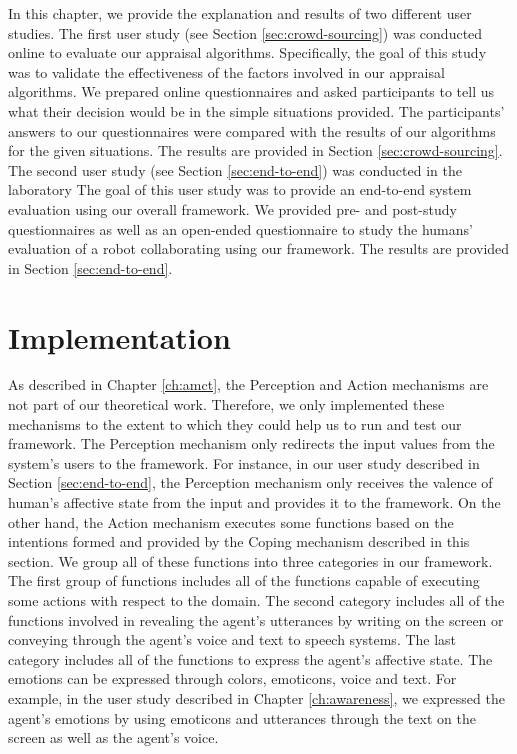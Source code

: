 \documentclass[12pt]{report}
\begin{document}
In this chapter, we provide the explanation and results of two different user
studies. The first user study (see Section \ref{sec:crowd-sourcing}) was
conducted online to evaluate our appraisal algorithms. Specifically, the goal of
this study was to validate the effectiveness of the factors involved in our
appraisal algorithms. We prepared online questionnaires and asked participants
to tell us what their decision would be in the simple situations provided. The
participants' answers to our questionnaires were compared with the results of
our algorithms for the given situations. The results are provided in Section
\ref{sec:crowd-sourcing}. The second user study (see Section
\ref{sec:end-to-end}) was conducted in the laboratory The goal of this user
study was to provide an end-to-end system evaluation using our overall
framework. We provided pre- and post-study questionnaires as well as an
open-ended questionnaire to study the humans' evaluation of a robot
collaborating using our framework. The results are provided in Section
\ref{sec:end-to-end}.

\section{Implementation}
As described in Chapter \ref{ch:amct}, the Perception and Action mechanisms are
not part of our theoretical work. Therefore, we only implemented these
mechanisms to the extent to which they could help us to run and test our
framework. The Perception mechanism only redirects the input values from the
system's users to the framework. For instance, in our user study described in
Section \ref{sec:end-to-end}, the Perception mechanism only receives the valence
of human's affective state from the input and provides it to the framework.
On the other hand, the Action mechanism executes some functions based on the
intentions formed and provided by the Coping mechanism described in this
section. We group all of these functions into three categories in our framework.
The first group of functions includes all of the functions capable of executing
some actions with respect to the domain. The second category includes all of the
functions involved in revealing the agent's utterances by writing on the screen or
conveying through the agent's voice and text to speech systems. The last
category includes all of the functions to express the agent's affective state. The
emotions can be expressed through colors, emoticons, voice and text. For
example, in the user study described in Chapter \ref{ch:awareness}, we expressed
the agent's emotions by using emoticons and utterances through the text on the
screen as well as the agent's voice. 
\end{document}
